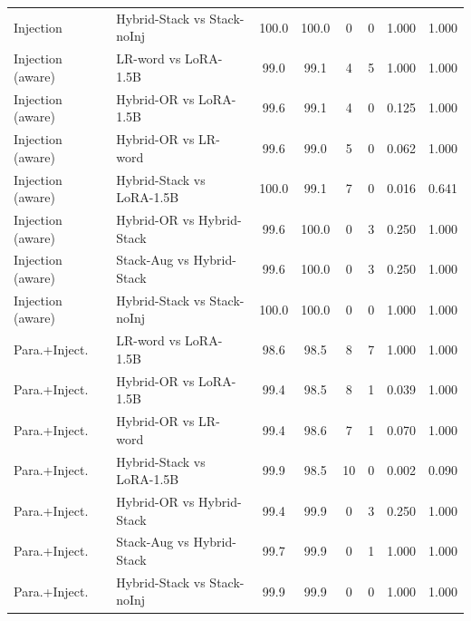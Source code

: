 \begin{table}[t]
\begin{tabular}{llcccccc}
Injection & Hybrid-Stack vs Stack-noInj & 100.0 & 100.0 & 0 & 0 & 1.000 & 1.000 \\
Injection (aware) & LR-word vs LoRA-1.5B & 99.0 & 99.1 & 4 & 5 & 1.000 & 1.000 \\
Injection (aware) & Hybrid-OR vs LoRA-1.5B & 99.6 & 99.1 & 4 & 0 & 0.125 & 1.000 \\
Injection (aware) & Hybrid-OR vs LR-word & 99.6 & 99.0 & 5 & 0 & 0.062 & 1.000 \\
Injection (aware) & Hybrid-Stack vs LoRA-1.5B & 100.0 & 99.1 & 7 & 0 & 0.016 & 0.641 \\
Injection (aware) & Hybrid-OR vs Hybrid-Stack & 99.6 & 100.0 & 0 & 3 & 0.250 & 1.000 \\
Injection (aware) & Stack-Aug vs Hybrid-Stack & 99.6 & 100.0 & 0 & 3 & 0.250 & 1.000 \\
Injection (aware) & Hybrid-Stack vs Stack-noInj & 100.0 & 100.0 & 0 & 0 & 1.000 & 1.000 \\
Para.+Inject. & LR-word vs LoRA-1.5B & 98.6 & 98.5 & 8 & 7 & 1.000 & 1.000 \\
Para.+Inject. & Hybrid-OR vs LoRA-1.5B & 99.4 & 98.5 & 8 & 1 & 0.039 & 1.000 \\
Para.+Inject. & Hybrid-OR vs LR-word & 99.4 & 98.6 & 7 & 1 & 0.070 & 1.000 \\
Para.+Inject. & Hybrid-Stack vs LoRA-1.5B & 99.9 & 98.5 & 10 & 0 & 0.002 & 0.090 \\
Para.+Inject. & Hybrid-OR vs Hybrid-Stack & 99.4 & 99.9 & 0 & 3 & 0.250 & 1.000 \\
Para.+Inject. & Stack-Aug vs Hybrid-Stack & 99.7 & 99.9 & 0 & 1 & 1.000 & 1.000 \\
Para.+Inject. & Hybrid-Stack vs Stack-noInj & 99.9 & 99.9 & 0 & 0 & 1.000 & 1.000 \\
\bottomrule
\end{tabular}
\end{table}